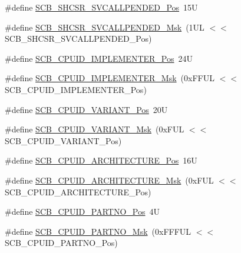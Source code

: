 \begin{DoxyCompactItemize}
\item 
\#define \mbox{\hyperlink{group___c_m_s_i_s___s_c_b_ga2f93ec9b243f94cdd3e94b8f0bf43641}{S\+C\+B\+\_\+\+S\+H\+C\+S\+R\+\_\+\+S\+V\+C\+A\+L\+L\+P\+E\+N\+D\+E\+D\+\_\+\+Pos}}~15U
\item 
\#define \mbox{\hyperlink{group___c_m_s_i_s___s_c_b_ga6095a7acfbad66f52822b1392be88652}{S\+C\+B\+\_\+\+S\+H\+C\+S\+R\+\_\+\+S\+V\+C\+A\+L\+L\+P\+E\+N\+D\+E\+D\+\_\+\+Msk}}~(1\+U\+L $<$$<$ S\+C\+B\+\_\+\+S\+H\+C\+S\+R\+\_\+\+S\+V\+C\+A\+L\+L\+P\+E\+N\+D\+E\+D\+\_\+\+Pos)
\item 
\#define \mbox{\hyperlink{group___c_m_s_i_s___s_c_b_ga58686b88f94f789d4e6f429fe1ff58cf}{S\+C\+B\+\_\+\+C\+P\+U\+I\+D\+\_\+\+I\+M\+P\+L\+E\+M\+E\+N\+T\+E\+R\+\_\+\+Pos}}~24U
\item 
\#define \mbox{\hyperlink{group___c_m_s_i_s___s_c_b_ga0932b31faafd47656a03ced75a31d99b}{S\+C\+B\+\_\+\+C\+P\+U\+I\+D\+\_\+\+I\+M\+P\+L\+E\+M\+E\+N\+T\+E\+R\+\_\+\+Msk}}~(0x\+F\+F\+U\+L $<$$<$ S\+C\+B\+\_\+\+C\+P\+U\+I\+D\+\_\+\+I\+M\+P\+L\+E\+M\+E\+N\+T\+E\+R\+\_\+\+Pos)
\item 
\#define \mbox{\hyperlink{group___c_m_s_i_s___s_c_b_ga104462bd0815391b4044a70bd15d3a71}{S\+C\+B\+\_\+\+C\+P\+U\+I\+D\+\_\+\+V\+A\+R\+I\+A\+N\+T\+\_\+\+Pos}}~20U
\item 
\#define \mbox{\hyperlink{group___c_m_s_i_s___s_c_b_gad358dfbd04300afc1824329d128b99e8}{S\+C\+B\+\_\+\+C\+P\+U\+I\+D\+\_\+\+V\+A\+R\+I\+A\+N\+T\+\_\+\+Msk}}~(0x\+F\+U\+L $<$$<$ S\+C\+B\+\_\+\+C\+P\+U\+I\+D\+\_\+\+V\+A\+R\+I\+A\+N\+T\+\_\+\+Pos)
\item 
\#define \mbox{\hyperlink{group___c_m_s_i_s___s_c_b_gaf8b3236b08fb8e840efb682645fb0e98}{S\+C\+B\+\_\+\+C\+P\+U\+I\+D\+\_\+\+A\+R\+C\+H\+I\+T\+E\+C\+T\+U\+R\+E\+\_\+\+Pos}}~16U
\item 
\#define \mbox{\hyperlink{group___c_m_s_i_s___s_c_b_gafae4a1f27a927338ae9dc51a0e146213}{S\+C\+B\+\_\+\+C\+P\+U\+I\+D\+\_\+\+A\+R\+C\+H\+I\+T\+E\+C\+T\+U\+R\+E\+\_\+\+Msk}}~(0x\+F\+U\+L $<$$<$ S\+C\+B\+\_\+\+C\+P\+U\+I\+D\+\_\+\+A\+R\+C\+H\+I\+T\+E\+C\+T\+U\+R\+E\+\_\+\+Pos)
\item 
\#define \mbox{\hyperlink{group___c_m_s_i_s___s_c_b_ga705f68eaa9afb042ca2407dc4e4629ac}{S\+C\+B\+\_\+\+C\+P\+U\+I\+D\+\_\+\+P\+A\+R\+T\+N\+O\+\_\+\+Pos}}~4U
\item 
\#define \mbox{\hyperlink{group___c_m_s_i_s___s_c_b_ga98e581423ca016680c238c469aba546d}{S\+C\+B\+\_\+\+C\+P\+U\+I\+D\+\_\+\+P\+A\+R\+T\+N\+O\+\_\+\+Msk}}~(0x\+F\+F\+F\+U\+L $<$$<$ S\+C\+B\+\_\+\+C\+P\+U\+I\+D\+\_\+\+P\+A\+R\+T\+N\+O\+\_\+\+Pos)
$$
\end{DoxyCompactItemize}
